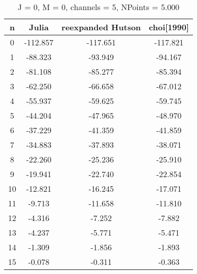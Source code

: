 \documentclass[12pt]{article}
\begin{document}
\begin{table}[H]
    \begin{center}
    \caption{J = 0, M = 0, channels = 5, NPoints = 5.000}
    \begin{tabular}{cccc}
    \toprule[1.5pt]
    n & Julia & reexpanded Hutson & choi[1990] \\[1.5pt]
    \hline
        0 & -112.857 & -117.651 & -117.821 \\
        1 & -88.323 & -93.949 & -94.167 \\
        2 & -81.108 & -85.277 & -85.394 \\
        3 & -62.250 & -66.658 & -67.012 \\
        4 & -55.937 & -59.625 & -59.745 \\
        5 & -44.204 & -47.965 & -48.970 \\
        6 & -37.229 & -41.359 & -41.859 \\
        7 & -34.883 & -37.893 & -38.071 \\
        8 & -22.260 & -25.236 & -25.910 \\
        9 & -19.941 & -22.740 & -22.854 \\
       10 & -12.821 & -16.245 & -17.071 \\
       11 & -9.713 & -11.658 & -11.810 \\
       12 & -4.316 &  -7.252 & -7.882 \\
       13 & -4.237 &  -5.771 & -5.471 \\
       14 & -1.309 &  -1.856 & -1.893 \\
       15 & -0.078 &  -0.311 & -0.363 \\
    \bottomrule
\end{tabular}
\end{center}
\end{table}
\end{document}
